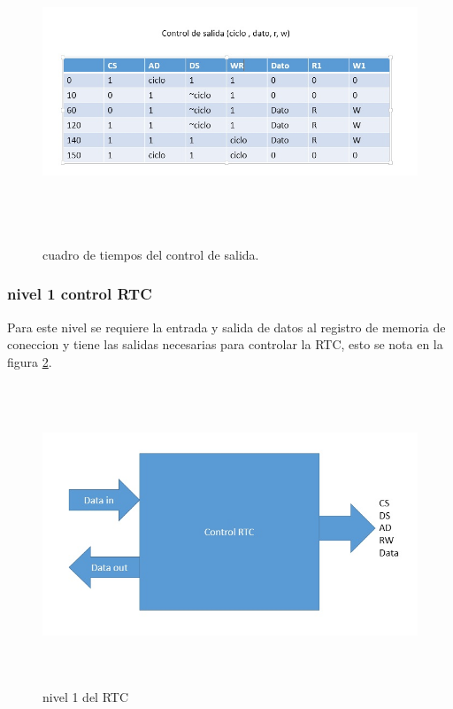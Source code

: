 \documentclass[12pt,a4paper]{article}
\begin{document}
		\begin{figure}[htbp]
			\centering
			\includegraphics[height=9cm, width=16cm]{img/cuadrotiemposalida.jpg}
			\caption[3erNivel]{cuadro de tiempos del control de salida.}
			\label{fig:CTS}
		\end{figure}
		\subsubsection{nivel 1 control RTC}
		Para este nivel se requiere la entrada y salida de datos al registro de memoria de coneccion y tiene las salidas necesarias para controlar la RTC, esto se nota en la figura \ref{fig:nivel1RTC}.\\[2ex]
		\begin{figure}[htbp]
			\centering
			\includegraphics[height=9cm, width=16cm]{img/nivel1_RTC.jpg}
			\caption[3erNivel]{nivel 1 del RTC}
			\label{fig:nivel1RTC}
		\end{figure}
\end{document}

